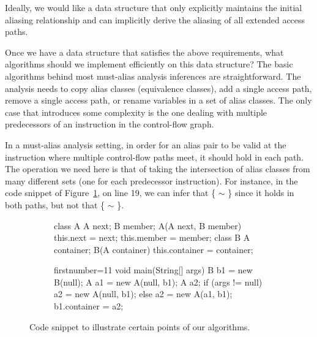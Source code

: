 Ideally, we would like a data structure that only explicitly maintains the initial aliasing relationship and can implicitly derive the aliasing of all extended access paths.


Once we have a data structure that satisfies the above requirements, what algorithms should we implement efficiently on this data structure? The basic algorithms behind most must-alias analysis inferences are straightforward. The analysis needs to copy alias classes (equivalence classes), add a single access path, remove a single access path, or rename variables in a set of alias classes. The only case that introduces some complexity is the one dealing with multiple predecessors of an instruction in the control-flow graph.

In a must-alias analysis setting, in order for an alias pair to be valid at the instruction where multiple control-flow paths meet, it should hold in each path. The operation we need here is that of taking the intersection of alias classes from many different sets (one for each predecessor instruction). For instance, in the code snippet of Figure~\ref{fig:must-data:snippet}, on line 19, we can infer that \{ $\sim$ \} since it holds in both paths, but not that \{ $\sim$ \}.

\begin{figure}[htb!p]
\begin{subfigure}{.45\textwidth}
\begin{javacode}
class A { 
    A next;
    B member;
    A(A next, B member) {
        this.next = next;
        this.member = member; } }
class B {
    A container;
    B(A container) {
        this.container = container; } }
\end{javacode}
\end{subfigure}%
\hfill
\begin{subfigure}{.45\textwidth}
\begin{javacode*}{firstnumber=11}
void main(String[] args) {
    B b1 = new B(null);
    A a1 = new A(null, b1);
    A a2;
    if (args != null) 
        a2 = new A(null, b1);
    else
        a2 = new A(a1, b1);
    b1.container = a2;
}
\end{javacode*}
\end{subfigure}
\caption[Code snippet for illustrating the data structure algorithms]{Code snippet to illustrate certain points of our algorithms.}
\label{fig:must-data:snippet}
\end{figure}


